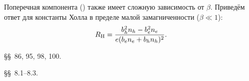 \begin{lab:example}
Поперечная компонента () также имеет сложную
зависимость от $\beta$. Приведём ответ для константы Холла
в пределе малой замагниченности ($\beta \ll 1$):
\begin{equation}
    \eqmark{3.21}
    R_{\rm H} = \frac{b_h^2 n_h - b_e^2 n_e}%
{e(b_en_e+b_hn_h)^2}.
\end{equation}
\end{lab:example}


\begin{lab:literature}
    \item \SivuhinIII \S\S~86, 95, 98, 100.
    \item \KingLokOlh \S\S~8.1--8.3.
\end{lab:literature}

